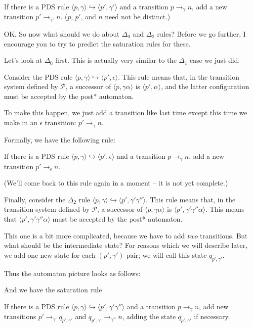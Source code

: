\documentclass{article}
\newcommand{\Config}[2]{\ensuremath{\langle #1, #2 \rangle}}
\newcommand{\Rule}[2]{\ensuremath{#1 \hookrightarrow #2}}
\newcommand{\Trans}[3]{\ensuremath{#1 \rightarrow_{#2} #3}}
\begin{document}
   If there is a PDS rule
   \Rule{\Config{p}{\gamma}}{\Config{p'}{\gamma'}} and a transition
   \Trans{p}{\gamma}{n}, add a new transition
   \Trans{p'}{\gamma'}{n}. ($p$, $p'$, and $n$ need not be distinct.)

OK. So now what should we do about $\Delta_0$ and $\Delta_2$ rules?
Before we go further, I encourage you to try to predict the saturation
rules for these.

Let's look at $\Delta_0$ first. This is actually very similar to the
$\Delta_1$ case we just did:

Consider the PDS rule
\Rule{\Config{p}{\gamma}}{\Config{p'}{\epsilon}}. This rule means that,
in the transition system defined by $\mathcal{P}$, a successor of
\Config{p}{\gamma\alpha} is \Config{p'}{\alpha}, and the latter
configuration must be accepted by the post* automaton.

To make this happen, we just add a transition like last time except
this time we make in an $\epsilon$ transition:
$\Trans{p'}{\gamma}{n}$.

Formally, we have the following rule:

   If there is a PDS rule
   \Rule{\Config{p}{\gamma}}{\Config{p'}{\epsilon}} and a transition
   \Trans{p}{\gamma}{n}, add a new transition
   \Trans{p'}{\epsilon}{n}.

(We'll come back to this rule again in a moment -- it is not yet
complete.)

Finally, consider the $\Delta_2$ rule
\Rule{\Config{p}{\gamma}}{\Config{p'}{\gamma'\gamma''}}. This rule
means that, in the transition system defined by $\mathcal{P}$, a
successor of \Config{p}{\gamma\alpha} is
\Config{p'}{\gamma'\gamma''\alpha}. This means that
\Config{p'}{\gamma'\gamma''\alpha} must be accepted by the post*
automaton.

This one is a bit more complicated, because we have to add \emph{two}
transitions. But what should be the intermediate state? For reasons
which we will describe later, we add one new state for each
$(p',\gamma')$ pair; we will call this state $q_{p',\gamma'}$.

Thus the automaton picture looks as follows:

And we have the saturation rule

   If there is a PDS rule
   \Rule{\Config{p}{\gamma}}{\Config{p'}{\gamma'\gamma''}} and a
   transition \Trans{p}{\gamma}{n}, add new transitions
   \Trans{p'}{\gamma'}{q_{p',\gamma'}} and
   \Trans{q_{p',\gamma'}}{\gamma''}{n}, adding the state $q_{p',\gamma'}$
   if necessary.
\end{document}
